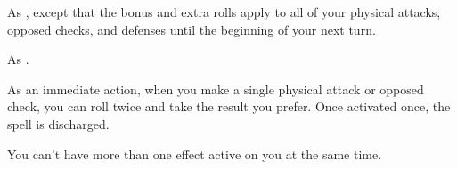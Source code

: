 \begin{spellheader}
\end{spellheader}
\begin{spellcontent}
    \begin{spelltargetinginfo}
    \end{spelltargetinginfo}
    \begin{spelleffects}
        \spelleffect As , except that the bonus and extra rolls apply to all of your physical attacks, opposed checks, and defenses until the beginning of your next turn.
    \end{spelleffects}
\end{spellcontent}
\begin{spellfooter}
    \spellnotes As .
\end{spellfooter}

\begin{spellheader}
\end{spellheader}
\begin{spellcontent}
    \begin{spelltargetinginfo}
    \end{spelltargetinginfo}
    \begin{spelleffects}
        \spelleffect As an immediate action, when you make a single physical attack or opposed check, you can roll twice and take the result you prefer. Once activated once, the spell is discharged.
    \end{spelleffects}
\end{spellcontent}
\begin{spellfooter}
    \spellnotes You can't have more than one  effect active on you at the same time.
\end{spellfooter}

\begin{comment}
\subsubsection{O-P}
\end{comment}

